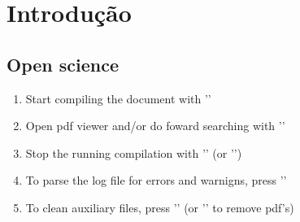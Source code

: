 \documentclass{a4page}
\begin{document}
\chapter{Introdução}

\section{Open science}


\begin{enumerate}
	\item Start compiling the document with '\ll'
	\item Open pdf viewer and/or do foward searching with '\lv'
	\item Stop the running compilation with '\ll' (or '\lk') 
	\item To parse the log file for errors and warnigns, press '\le'
	\item To clean auxiliary files, press '\lc' (or '\lC' to remove pdf's)
\end{enumerate}
\end{document}
